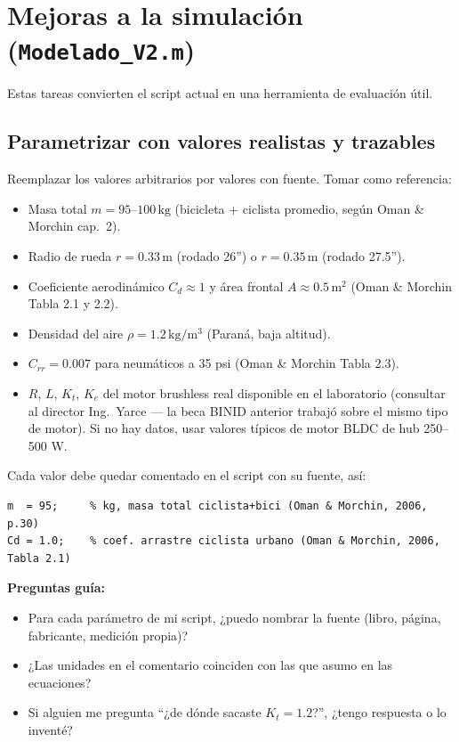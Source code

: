 \documentclass[11pt,a4paper]{article}
\newcommand{\unit}[1]{\,\mathrm{#1}}
\begin{document}
\hrulefill

\section{Mejoras a la simulación (\texttt{Modelado\_V2.m})}

Estas tareas convierten el script actual en una herramienta de evaluación útil.

\subsection{Parametrizar con valores realistas y trazables}

Reemplazar los valores arbitrarios por valores con fuente. Tomar como referencia:

\begin{itemize}
    \item Masa total $m = 95\text{--}100\unit{kg}$ (bicicleta + ciclista promedio, según Oman \& Morchin cap.~2).
    \item Radio de rueda $r = 0.33\unit{m}$ (rodado 26'') o $r = 0.35\unit{m}$ (rodado 27.5'').
    \item Coeficiente aerodinámico $C_d \approx 1$ y área frontal $A \approx 0.5\unit{m^2}$ (Oman \& Morchin Tabla 2.1 y 2.2).
    \item Densidad del aire $\rho = 1.2\unit{kg/m^3}$ (Paraná, baja altitud).
    \item $C_{rr} = 0.007$ para neumáticos a 35 psi (Oman \& Morchin Tabla 2.3).
    \item $R$, $L$, $K_t$, $K_e$ del motor brushless real disponible en el laboratorio (consultar al director Ing.\ Yarce --- la beca BINID anterior trabajó sobre el mismo tipo de motor). Si no hay datos, usar valores típicos de motor BLDC de hub 250--500 W.
\end{itemize}

Cada valor debe quedar comentado en el script con su fuente, así:

\begin{lstlisting}[style=matlab]
m  = 95;     % kg, masa total ciclista+bici (Oman & Morchin, 2006, p.30)
Cd = 1.0;    % coef. arrastre ciclista urbano (Oman & Morchin, 2006, Tabla 2.1)
\end{lstlisting}

\begin{guia}
\textbf{Preguntas guía:}
\begin{itemize}
    \item Para cada parámetro de mi script, ¿puedo nombrar la fuente (libro, página, fabricante, medición propia)?
    \item ¿Las unidades en el comentario coinciden con las que asumo en las ecuaciones?
    \item Si alguien me pregunta ``¿de dónde sacaste $K_t = 1.2$?'', ¿tengo respuesta o lo inventé?
\end{itemize}
\end{guia}
\end{document}
